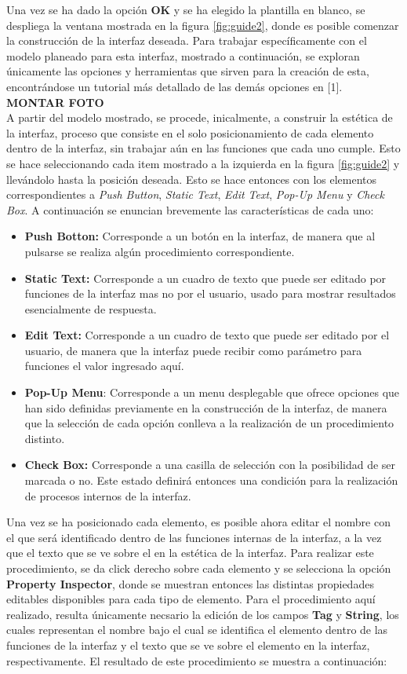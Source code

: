 \documentclass{article}
\begin{document}
\begin{multicols}{2}
Una vez se ha dado la opción \textbf{OK} y se ha elegido la plantilla en blanco, se despliega la ventana mostrada en la figura \ref{fig:guide2}, donde es posible comenzar la construcción de la interfaz deseada. Para trabajar específicamente con el modelo planeado para esta interfaz, mostrado a continuación, se exploran únicamente las opciones y herramientas que sirven para la creación de esta, encontrándose un tutorial más detallado de las demás opciones en [1]. \textbf{MONTAR FOTO}\\
A partir del modelo mostrado, se procede, inicalmente, a construir la estética de la interfaz, proceso que consiste en el solo posicionamiento de cada elemento dentro de la interfaz, sin trabajar aún en las funciones que cada uno cumple. Esto se hace seleccionando cada item mostrado a la izquierda en la figura \ref{fig:guide2} y llevándolo hasta la posición deseada. Esto se hace entonces con los elementos correspondientes a \textit{Push Button}, \textit{Static Text}, \textit{Edit Text}, \textit{Pop-Up Menu} y \textit{Check Box}. A continuación se enuncian brevemente las características de cada uno:
\begin{itemize}
\item \textbf{Push Botton:} Corresponde a un botón en la interfaz, de manera que al pulsarse se realiza algún procedimiento correspondiente.
\item \textbf{Static Text:} Corresponde a un cuadro de texto que puede ser editado por funciones de la interfaz mas no por el usuario, usado para mostrar resultados esencialmente de respuesta.
\item \textbf{Edit Text:} Corresponde a un cuadro de texto que puede ser editado por el usuario, de manera que la interfaz puede recibir como parámetro para funciones el valor ingresado aquí.
\item \textbf{Pop-Up Menu}: Corresponde a un menu desplegable que ofrece opciones que han sido definidas previamente en la construcción de la interfaz, de manera que la selección de cada opción conlleva a la realización de un procedimiento distinto.
\item \textbf{Check Box:} Corresponde a una casilla de selección con la posibilidad de ser marcada o no. Este estado definirá entonces una condición para la realización de procesos internos de la interfaz.
\end{itemize}
Una vez se ha posicionado cada elemento, es posible ahora editar el nombre con el que será identificado dentro de las funciones internas de la interfaz, a la vez que el texto que se ve sobre el en la estética de la interfaz. Para realizar este procedimiento, se da click derecho sobre cada elemento y se selecciona la opción \textbf{Property Inspector}, donde se muestran entonces las distintas propiedades editables disponibles para cada tipo de elemento. Para el procedimiento aquí realizado,  resulta únicamente necsario la edición de los campos \textbf{Tag} y \textbf{String}, los cuales representan el nombre bajo el cual se identifica el elemento dentro de las funciones de la interfaz y el texto que se ve sobre el elemento en la interfaz, respectivamente. El resultado de este procedimiento se muestra a continuación:


\end{multicols}
\end{document}
